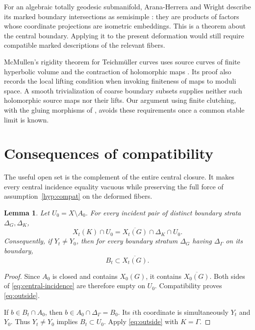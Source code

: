 \documentclass[11pt]{article}
\newcommand{\cl}[1]{\overline{#1}}
\newtheorem{lemma}[theorem]{Lemma}
\theoremstyle{definition}
\theoremstyle{remark}
\begin{document}
For an algebraic totally geodesic submanifold, Arana-Herrera and Wright describe its marked boundary intersections as semisimple \cite[Theorem~1.3]{AW}: they are products of factors whose coordinate projections are isometric embeddings. This is a theorem about the central boundary. Applying it to the present deformation would still require compatible marked descriptions of the relevant fibers.

McMullen's rigidity theorem for Teichm\"uller curves uses source curves of finite hyperbolic volume and the contraction of holomorphic maps \cite[Theorem~1 and its proof]{McMullen}. Its proof also records the local lifting condition when invoking finiteness of maps to moduli space. A smooth trivialization of coarse boundary subsets supplies neither such holomorphic source maps nor their lifts. Our argument using finite clutching, with the gluing morphisms of \cite[Definition~4.1 and Proposition~4.4]{EF}, avoids these requirements once a common stable limit is known.

\section{Consequences of compatibility}\label{sec:compat}

The useful open set is the complement of the entire central closure. It makes every central incidence equality vacuous while preserving the full force of assumption~\ref{hyp:compat} on the deformed fibers.

\begin{lemma}\label{lem:outside}
Let $U_0=X\setminus A_0$. For every incident pair of distinct boundary strata $\Delta_G,\Delta_K$,
\begin{equation}\label{eq:outside}
 X_t(K)\cap U_0=\cl{X_t(G)}\cap\Delta_K\cap U_0.
\end{equation}
Consequently, if $Y_t\ne Y_0$, then for every boundary stratum $\Delta_G$ having $\Delta_\Gamma$ on its boundary,
\begin{equation}\label{eq:moving}
 B_t\subset\cl{X_t(G)}.
\end{equation}
\end{lemma}

\begin{proof}
Since $A_0$ is closed and contains $X_0(G)$, it contains $\cl{X_0(G)}$. Both sides of \eqref{eq:central-incidence} are therefore empty on $U_0$. Compatibility proves \eqref{eq:outside}.

If $b\in B_t\cap A_0$, then $b\in A_0\cap\Delta_\Gamma=B_0$. Its $i$th coordinate is simultaneously $Y_t$ and $Y_0$. Thus $Y_t\ne Y_0$ implies $B_t\subset U_0$. Apply \eqref{eq:outside} with $K=\Gamma$.
\end{proof}
\end{document}
